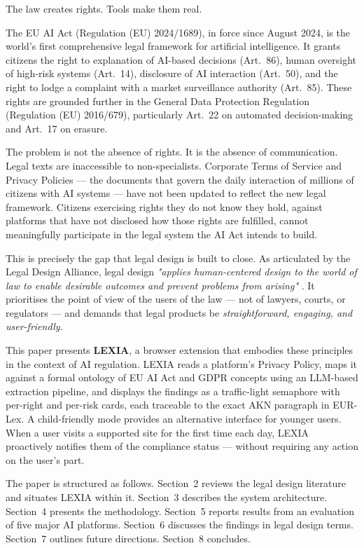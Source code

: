 \documentclass[12pt, a4paper]{article}
\begin{document}
The law creates rights. Tools make them real.

The EU AI Act (Regulation (EU) 2024/1689), in force since August 2024, is the world's first comprehensive legal framework for artificial intelligence. It grants citizens the right to explanation of AI-based decisions (Art.\ 86), human oversight of high-risk systems (Art.\ 14), disclosure of AI interaction (Art.\ 50), and the right to lodge a complaint with a market surveillance authority (Art.\ 85). These rights are grounded further in the General Data Protection Regulation (Regulation (EU) 2016/679), particularly Art.\ 22 on automated decision-making and Art.\ 17 on erasure.

The problem is not the absence of rights. It is the absence of communication. Legal texts are inaccessible to non-specialists. Corporate Terms of Service and Privacy Policies --- the documents that govern the daily interaction of millions of citizens with AI systems --- have not been updated to reflect the new legal framework. Citizens exercising rights they do not know they hold, against platforms that have not disclosed how those rights are fulfilled, cannot meaningfully participate in the legal system the AI Act intends to build.

This is precisely the gap that legal design is built to close. As articulated by the Legal Design Alliance, legal design \emph{"applies human-centered design to the world of law to enable desirable outcomes and prevent problems from arising"} \cite{lda2018}. It prioritises the point of view of the users of the law --- not of lawyers, courts, or regulators --- and demands that legal products be \emph{straightforward, engaging, and user-friendly}.

This paper presents \textbf{LEXIA}, a browser extension that embodies these principles in the context of AI regulation. LEXIA reads a platform's Privacy Policy, maps it against a formal ontology of EU AI Act and GDPR concepts using an LLM-based extraction pipeline, and displays the findings as a traffic-light semaphore with per-right and per-risk cards, each traceable to the exact AKN paragraph in EUR-Lex. A child-friendly mode provides an alternative interface for younger users. When a user visits a supported site for the first time each day, LEXIA proactively notifies them of the compliance status --- without requiring any action on the user's part.

The paper is structured as follows. Section~2 reviews the legal design literature and situates LEXIA within it. Section~3 describes the system architecture. Section~4 presents the methodology. Section~5 reports results from an evaluation of five major AI platforms. Section~6 discusses the findings in legal design terms. Section~7 outlines future directions. Section~8 concludes.
\end{document}
